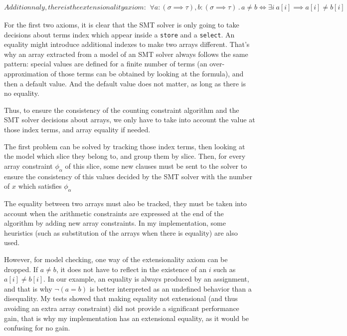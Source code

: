 \documentclass[]{article}
\begin{document}
{\begin{subequations}
    Additionnaly, there is the extensionality axiom:

    \begin{align}
        \forall a:(\sigma \implies \tau), b:(\sigma \implies \tau)\, .\, a \neq b \iff \exists i\: a[i] \implies a[i] \neq b[i]
    \end{align}
\end{subequations}

For the first two axioms, it is clear that the SMT solver is only going
to take decisions about terms index which appear inside a \texttt{store}
and a \texttt{select}. An equality might introduce additional indexes to
make two arrays different. That's why an array extracted from a model of
an SMT solver always follows the same pattern: special values are
defined for a finite number of terms (an over-approximation of those
terms can be obtained by looking at the formula), and then a default
value. And the default value does not matter, as long as there is no
equality.

\begin{example}
\end{example}


Thus, to ensure the consistency of the counting constraint algorithm and
the SMT solver decisions about arrays, we only have to take into account
the value at those index terms, and array equality if needed.

The first problem can be solved by tracking those index terms, then
looking at the model which slice they belong to, and group them by
slice. Then, for every array constraint $\phi_\alpha$ of this slice,
some new clauses must be sent to the solver to ensure the consistency of
this values decided by the SMT solver with the number of $x$ which
satisfies $\phi_\alpha$

The equality between two arrays must also be tracked, they must be taken
into account when the arithmetic constraints are expressed at the end of
the algorithm by adding new array constraints. In my implementation, some heuristics (such as
substitution of the arrays when there is equality) are also used.

However, for model checking, one way of the extensionality axiom can be dropped. If $a \neq b$, it
does not have to reflect in the existence of an $i$ such as $a[i] \neq b[i]$. In our example, an
equality is always produced by an assignment, and that is why $\lnot (a = b)$ is better interpreted
as an undefined behavior than a disequality. My tests showed that making equality not extensional
(and thus avoiding an extra array constraint) did not provide a significant performance gain, that
is why my implementation has an extensional equality, as it would be confusing for no gain.


}
\end{document}
